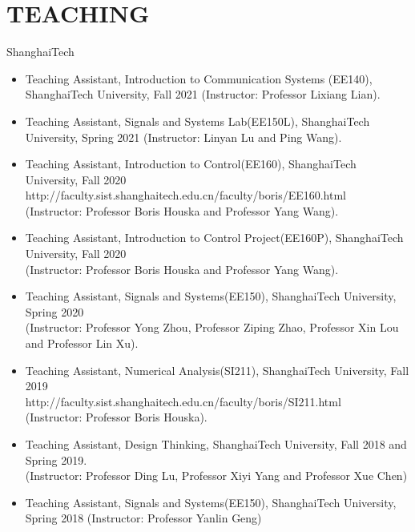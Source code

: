 \documentclass[paper=a4,fontsize=11pt]{scrartcl} %
\newlength{\spacebox}
\newcommand{\NewPart}[1]{\section*{\uppercase{#1}}}
\newcommand{\PersonalEntry}[2]{
	\noindent\hangindent=2em\hangafter=0 %
	\parbox{\spacebox}{        %
		\textit{#1}}		       %
	\hspace{1.5em} #2 \par}    %
\newcommand{\SkillsEntry}[2]{      %
	\noindent\hangindent=2em\hangafter=0 %
	\parbox{\spacebox}{        %
		\textit{#1}}			   %
	\hspace{1.5em} #2 \par}    %
\begin{document}
			\NewPart{Teaching}{ShanghaiTech}
			\begin{itemize}
				
				
				\item{Teaching Assistant, 	Introduction to Communication Systems (EE140), ShanghaiTech University, Fall 2021 (Instructor: Professor Lixiang Lian).}
				
				\item{Teaching Assistant, Signals and Systems Lab(EE150L), ShanghaiTech University, Spring 2021 (Instructor: Linyan Lu and Ping Wang).}
				
				\item{Teaching Assistant, Introduction to Control(EE160), ShanghaiTech University, Fall 2020\\ 
					http://faculty.sist.shanghaitech.edu.cn/faculty/boris/EE160.html\\
					(Instructor: Professor Boris Houska and Professor Yang Wang).
				}
				
				\item{Teaching Assistant, Introduction to Control Project(EE160P), ShanghaiTech University, Fall 2020\\ (Instructor: Professor Boris Houska and Professor Yang Wang).}
				
				\item{Teaching Assistant, Signals and Systems(EE150),  ShanghaiTech University, Spring 2020 \\ (Instructor: Professor Yong Zhou, Professor Ziping Zhao, Professor Xin Lou and Professor Lin Xu).}
				
				\item{Teaching Assistant, Numerical Analysis(SI211), ShanghaiTech University, Fall 2019\\ 
					{http://faculty.sist.shanghaitech.edu.cn/faculty/boris/SI211.html}\\
					(Instructor: Professor Boris Houska).
				}
				
				\item{Teaching Assistant, Design Thinking, ShanghaiTech University, Fall 2018 and Spring 2019.\\ (Instructor: Professor Ding Lu, Professor Xiyi Yang and Professor Xue Chen) }
				
				\item{Teaching Assistant, Signals and Systems(EE150),  ShanghaiTech University, Spring 2018 (Instructor: Professor Yanlin Geng)
					
				}
				
				
				
			\end{itemize}
			
			
			
			
		
\end{document}
